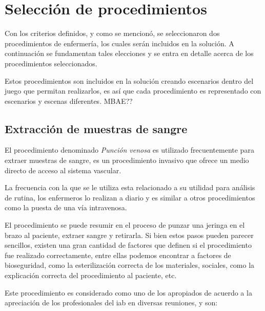 \section{Selección de procedimientos}
\label{sec:seleccion_escenas}



Con los criterios definidos, y como se mencionó, se seleccionaron dos
procedimientos de enfermería, los cuales serán incluidos en la solución. A
continuación se fundamentan tales elecciones y se entra en detalle acerca de los
procedimientos seleccionados.

Estos procedimientos son incluidos en la solución creando escenarios dentro 
del juego que permitan realizarlos, es así que cada procedimiento es 
representado con escenarios y escenas diferentes. MBAE??



\subsection{Extracción de muestras de sangre}
\label{sec:hemocultivo}

El procedimiento denominado \emph{Punción venosa} es utilizado frecuentemente
para extraer muestras de sangre, es un procedimiento invasivo que ofrece un
medio directo de acceso al sistema vascular. 

La frecuencia con la que se le utiliza esta relacionado a su utilidad para
análisis de rutina, los enfermeros lo realizan a diario y es similar a otros
procedimientos como la puesta de una vía intravenosa.

El procedimiento se puede resumir en el proceso de punzar una jeringa en el
brazo al paciente, extraer sangre y retirarla. Si bien estos pasos pueden parecer
sencillos, existen una gran cantidad de factores que definen si el procedimiento
fue realizado correctamente, entre ellas podemos encontrar a factores de 
bioseguridad, como la esterilización correcta de los materiales, sociales, como
la explicación correcta del procedimiento al paciente, etc.

Este procedimiento es considerado como uno de los apropiados de acuerdo a
la apreciación de los profesionales del \Gls{iab} en diversas reuniones, y son: 

